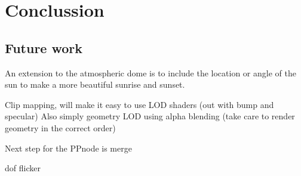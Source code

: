 
\chapter{Conclussion}








\section{Future work}

An extension to the atmospheric dome is to include the location or
angle of the sun to make a more beautiful sunrise and sunset.

Clip mapping, will make it easy to use LOD shaders (out with bump
and specular) Also simply geometry LOD using alpha blending (take
care to render geometry in the correct order)

Next step for the PPnode is merge

dof flicker

